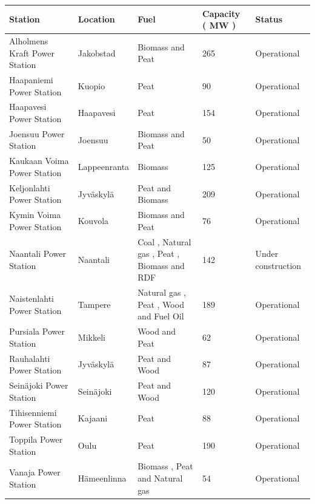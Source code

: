 \documentclass{article}
\begin{document}
\begin{tabular}{lllll}
\toprule
Station & Location & Fuel & Capacity ( MW ) & Status \\
\midrule
Alholmens Kraft Power Station & Jakobstad & Biomass and Peat & 265 & Operational \\
Haapaniemi Power Station & Kuopio & Peat & 90 & Operational \\
Haapavesi Power Station & Haapavesi & Peat & 154 & Operational \\
Joensuu Power Station & Joensuu & Biomass and Peat & 50 & Operational \\
Kaukaan Voima Power Station & Lappeenranta & Biomass & 125 & Operational \\
Keljonlahti Power Station & Jyväskylä & Peat and Biomass & 209 & Operational \\
Kymin Voima Power Station & Kouvola & Biomass and Peat & 76 & Operational \\
Naantali Power Station & Naantali & Coal , Natural gas , Peat , Biomass and RDF & 142 & Under construction \\
Naistenlahti Power Station & Tampere & Natural gas , Peat , Wood and Fuel Oil & 189 & Operational \\
Pursiala Power Station & Mikkeli & Wood and Peat & 62 & Operational \\
Rauhalahti Power Station & Jyväskylä & Peat and Wood & 87 & Operational \\
Seinäjoki Power Station & Seinäjoki & Peat and Wood & 120 & Operational \\
Tihisenniemi Power Station & Kajaani & Peat & 88 & Operational \\
Toppila Power Station & Oulu & Peat & 190 & Operational \\
Vanaja Power Station & Hämeenlinna & Biomass , Peat and Natural gas & 54 & Operational \\
\bottomrule
\end{tabular}
\end{document}
